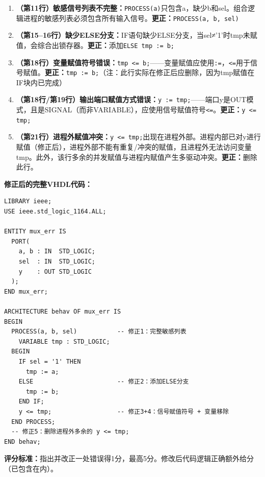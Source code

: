 \begin{enumerate}[label=\textbf{错误\arabic*：}, leftmargin=*]

\item \textbf{（第11行）敏感信号列表不完整：}\texttt{PROCESS(a)}只包含a，缺少b和sel。组合逻辑进程的敏感列表必须包含所有输入信号。\textbf{更正：}\texttt{PROCESS(a, b, sel)}

\item \textbf{（第15--16行）缺少ELSE分支：}IF语句缺少ELSE分支，当sel≠'1'时tmp未赋值，会综合出锁存器。\textbf{更正：}添加\texttt{ELSE tmp := b;}

\item \textbf{（第18行）变量赋值符号错误：}\texttt{tmp <= b;}——变量赋值应使用\verb|:=|，\verb|<=|用于信号赋值。\textbf{更正：}\texttt{tmp := b;}（注：此行实际在修正后应删除，因为tmp赋值在IF块内已完成）

\item \textbf{（第18行/第19行）输出端口赋值方式错误：}\texttt{y := tmp;}——端口y是OUT模式，且是SIGNAL（而非VARIABLE），应使用信号赋值符号\verb|<=|。\textbf{更正：}\texttt{y <= tmp;}

\item \textbf{（第21行）进程外赋值冲突：}\texttt{y <= tmp;}出现在进程外部。进程内部已对y进行赋值（修正后），进程外部不能有重复/冲突的赋值，且进程外无法访问变量tmp。此外，该行多余的并发赋值与进程内赋值产生多驱动冲突。\textbf{更正：}删除此行。

\end{enumerate}

\textbf{修正后的完整VHDL代码：}

\begin{lstlisting}[caption={修正后的二选一多路选择器VHDL代码}]
LIBRARY ieee;
USE ieee.std_logic_1164.ALL;

ENTITY mux_err IS
  PORT(
    a, b : IN  STD_LOGIC;
    sel  : IN  STD_LOGIC;
    y    : OUT STD_LOGIC
  );
END mux_err;

ARCHITECTURE behav OF mux_err IS
BEGIN
  PROCESS(a, b, sel)           -- 修正1：完整敏感列表
    VARIABLE tmp : STD_LOGIC;
  BEGIN
    IF sel = '1' THEN
      tmp := a;
    ELSE                       -- 修正2：添加ELSE分支
      tmp := b;
    END IF;
    y <= tmp;                  -- 修正3+4：信号赋值符号 + 变量移除
  END PROCESS;
  -- 修正5：删除进程外多余的 y <= tmp;
END behav;
\end{lstlisting}

\textbf{评分标准：}指出并改正一处错误得1分，最高5分。修改后代码逻辑正确额外给分（已包含在内）。

